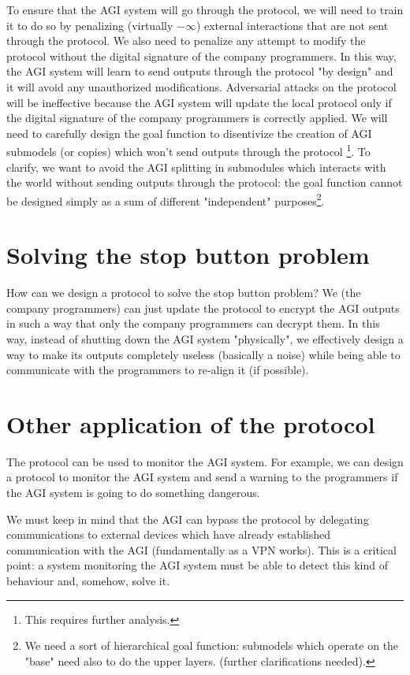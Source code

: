 \documentclass{article}
\begin{document}
To ensure that the AGI system will go through the protocol, we will need to train it to do so by penalizing (virtually $-\infty$) external interactions that are not sent through the protocol.
We also need to penalize any attempt to modify the protocol without the digital signature of the company programmers.
In this way, the AGI system will learn to send outputs through the protocol "by design" and it will avoid any unauthorized modifications.
Adversarial attacks on the protocol will be ineffective because the AGI system will update the local protocol only if the digital signature of the company programmers is correctly applied.
We will need to carefully design the goal function to disentivize the creation of AGI submodels (or copies) which won't send outputs through the protocol \footnote{This requires further analysis.}. 
To clarify, we want to avoid the AGI splitting in submodules which interacts with the world without sending outputs through the protocol: the goal function cannot be designed simply as a sum of different
 "independent" purposes\footnote{We need a sort of hierarchical goal function: submodels which operate on the "base" need also to do the upper layers. (further clarifications needed).}.

\section{Solving the stop button problem }
How can we design a protocol to solve the stop button problem?
We (the company programmers) can just update the protocol to encrypt the AGI outputs in such a way that only the company programmers can decrypt them.
In this way, instead of shutting down the AGI system "physically", we effectively design a way to make its outputs completely useless (basically a noise) 
while being able to communicate with the programmers to re-align it (if possible).

\section{Other application of the protocol}
The protocol can be used to monitor the AGI system.
For example, we can design a protocol to monitor the AGI system and send a warning to the programmers if the AGI system is going to do something dangerous.

We must keep in mind that the AGI can bypass the protocol by delegating communications to external devices which have already established communication with the AGI (fundamentally as a VPN works).
This is a critical point: a system monitoring the AGI system must be able to detect this kind of behaviour and, somehow, solve it.
\end{document}
